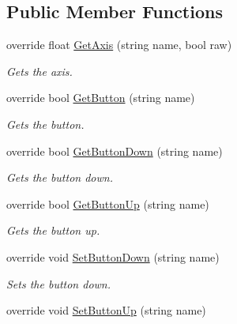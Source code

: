 \subsection*{Public Member Functions}
\begin{DoxyCompactItemize}
\item 
override float \hyperlink{class_lerp2_assets_1_1_cross_platform_input_1_1_platform_specific_1_1_standalone_input_aee3650ff35b358d61f859bbeb3111e52}{Get\+Axis} (string name, bool raw)
\begin{DoxyCompactList}\small\item\em Gets the axis. \end{DoxyCompactList}\item 
override bool \hyperlink{class_lerp2_assets_1_1_cross_platform_input_1_1_platform_specific_1_1_standalone_input_aa54949ca8bdb75bec799a40267626108}{Get\+Button} (string name)
\begin{DoxyCompactList}\small\item\em Gets the button. \end{DoxyCompactList}\item 
override bool \hyperlink{class_lerp2_assets_1_1_cross_platform_input_1_1_platform_specific_1_1_standalone_input_aa6202d5f426869304b8d8c4f7747c82c}{Get\+Button\+Down} (string name)
\begin{DoxyCompactList}\small\item\em Gets the button down. \end{DoxyCompactList}\item 
override bool \hyperlink{class_lerp2_assets_1_1_cross_platform_input_1_1_platform_specific_1_1_standalone_input_ace14ca6435635fc1d2ddaf1731f8410c}{Get\+Button\+Up} (string name)
\begin{DoxyCompactList}\small\item\em Gets the button up. \end{DoxyCompactList}\item 
override void \hyperlink{class_lerp2_assets_1_1_cross_platform_input_1_1_platform_specific_1_1_standalone_input_a13ea072e40caff4862a5db57c90b3f74}{Set\+Button\+Down} (string name)
\begin{DoxyCompactList}\small\item\em Sets the button down. \end{DoxyCompactList}\item 
override void \hyperlink{class_lerp2_assets_1_1_cross_platform_input_1_1_platform_specific_1_1_standalone_input_a1f0d1a8eab3bd627b8c62ec3ef601576}{Set\+Button\+Up} (string name)

\end{DoxyCompactItemize}
